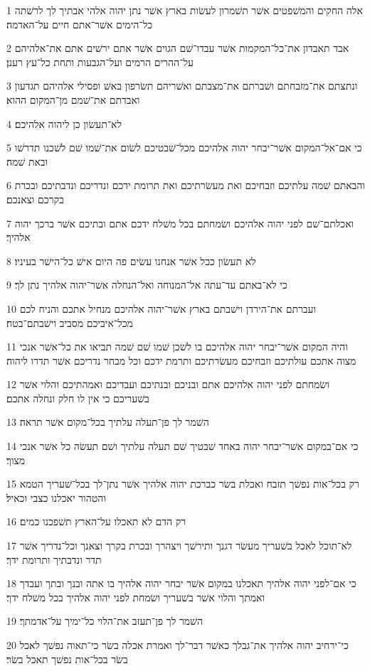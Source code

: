 \par 1 אלה החקים והמשׁפטים אשׁר תשׁמרון לעשׂות בארץ אשׁר נתן יהוה אלהי אבתיך לך לרשׁתה כל־הימים אשׁר־אתם חיים על־האדמה׃
\par 2 אבד תאבדון את־כל־המקמות אשׁר עבדו־שׁם הגוים אשׁר אתם ירשׁים אתם את־אלהיהם על־ההרים הרמים ועל־הגבעות ותחת כל־עץ רענן׃
\par 3 ונתצתם את־מזבחתם ושׁברתם את־מצבתם ואשׁריהם תשׂרפון באשׁ ופסילי אלהיהם תגדעון ואבדתם את־שׁמם מן־המקום ההוא׃
\par 4 לא־תעשׂון כן ליהוה אלהיכם׃
\par 5 כי אם־אל־המקום אשׁר־יבחר יהוה אלהיכם מכל־שׁבטיכם לשׂום את־שׁמו שׁם לשׁכנו תדרשׁו ובאת שׁמה׃
\par 6 והבאתם שׁמה עלתיכם וזבחיכם ואת מעשׂרתיכם ואת תרומת ידכם ונדריכם ונדבתיכם ובכרת בקרכם וצאנכם׃
\par 7 ואכלתם־שׁם לפני יהוה אלהיכם ושׂמחתם בכל משׁלח ידכם אתם ובתיכם אשׁר ברכך יהוה אלהיך׃
\par 8 לא תעשׂון ככל אשׁר אנחנו עשׂים פה היום אישׁ כל־הישׁר בעיניו׃
\par 9 כי לא־באתם עד־עתה אל־המנוחה ואל־הנחלה אשׁר־יהוה אלהיך נתן לך׃
\par 10 ועברתם את־הירדן וישׁבתם בארץ אשׁר־יהוה אלהיכם מנחיל אתכם והניח לכם מכל־איביכם מסביב וישׁבתם־בטח׃
\par 11 והיה המקום אשׁר־יבחר יהוה אלהיכם בו לשׁכן שׁמו שׁם שׁמה תביאו את כל־אשׁר אנכי מצוה אתכם עולתיכם וזבחיכם מעשׂרתיכם ותרמת ידכם וכל מבחר נדריכם אשׁר תדרו ליהוה׃
\par 12 ושׂמחתם לפני יהוה אלהיכם אתם ובניכם ובנתיכם ועבדיכם ואמהתיכם והלוי אשׁר בשׁעריכם כי אין לו חלק ונחלה אתכם׃
\par 13 השׁמר לך פן־תעלה עלתיך בכל־מקום אשׁר תראה׃
\par 14 כי אם־במקום אשׁר־יבחר יהוה באחד שׁבטיך שׁם תעלה עלתיך ושׁם תעשׂה כל אשׁר אנכי מצוך׃
\par 15 רק בכל־אות נפשׁך תזבח ואכלת בשׂר כברכת יהוה אלהיך אשׁר נתן־לך בכל־שׁעריך הטמא והטהור יאכלנו כצבי וכאיל׃
\par 16 רק הדם לא תאכלו על־הארץ תשׁפכנו כמים׃
\par 17 לא־תוכל לאכל בשׁעריך מעשׂר דגנך ותירשׁך ויצהרך ובכרת בקרך וצאנך וכל־נדריך אשׁר תדר ונדבתיך ותרומת ידך׃
\par 18 כי אם־לפני יהוה אלהיך תאכלנו במקום אשׁר יבחר יהוה אלהיך בו אתה ובנך ובתך ועבדך ואמתך והלוי אשׁר בשׁעריך ושׂמחת לפני יהוה אלהיך בכל משׁלח ידך׃
\par 19 השׁמר לך פן־תעזב את־הלוי כל־ימיך על־אדמתך׃
\par 20 כי־ירחיב יהוה אלהיך את־גבלך כאשׁר דבר־לך ואמרת אכלה בשׂר כי־תאוה נפשׁך לאכל בשׂר בכל־אות נפשׁך תאכל בשׂר׃
